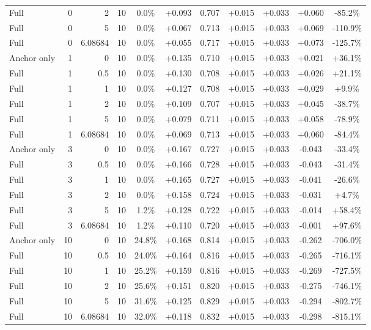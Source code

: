 \begin{table}[htbp]
\begin{tabular}{lrrrccccccc}
Full & 0 & 2 & 10 & 0.0\% & +0.093 & 0.707 & +0.015 & +0.033 & +0.060 & -85.2\% \\
Full & 0 & 5 & 10 & 0.0\% & +0.067 & 0.713 & +0.015 & +0.033 & +0.069 & -110.9\% \\
Full & 0 & 6.08684 & 10 & 0.0\% & +0.055 & 0.717 & +0.015 & +0.033 & +0.073 & -125.7\% \\
Anchor only & 1 & 0 & 10 & 0.0\% & +0.135 & 0.710 & +0.015 & +0.033 & +0.021 & +36.1\% \\
Full & 1 & 0.5 & 10 & 0.0\% & +0.130 & 0.708 & +0.015 & +0.033 & +0.026 & +21.1\% \\
Full & 1 & 1 & 10 & 0.0\% & +0.127 & 0.708 & +0.015 & +0.033 & +0.029 & +9.9\% \\
Full & 1 & 2 & 10 & 0.0\% & +0.109 & 0.707 & +0.015 & +0.033 & +0.045 & -38.7\% \\
Full & 1 & 5 & 10 & 0.0\% & +0.079 & 0.711 & +0.015 & +0.033 & +0.058 & -78.9\% \\
Full & 1 & 6.08684 & 10 & 0.0\% & +0.069 & 0.713 & +0.015 & +0.033 & +0.060 & -84.4\% \\
Anchor only & 3 & 0 & 10 & 0.0\% & +0.167 & 0.727 & +0.015 & +0.033 & -0.043 & -33.4\% \\
Full & 3 & 0.5 & 10 & 0.0\% & +0.166 & 0.728 & +0.015 & +0.033 & -0.043 & -31.4\% \\
Full & 3 & 1 & 10 & 0.0\% & +0.165 & 0.727 & +0.015 & +0.033 & -0.041 & -26.6\% \\
Full & 3 & 2 & 10 & 0.0\% & +0.158 & 0.724 & +0.015 & +0.033 & -0.031 & +4.7\% \\
Full & 3 & 5 & 10 & 1.2\% & +0.128 & 0.722 & +0.015 & +0.033 & -0.014 & +58.4\% \\
Full & 3 & 6.08684 & 10 & 1.2\% & +0.110 & 0.720 & +0.015 & +0.033 & -0.001 & +97.6\% \\
Anchor only & 10 & 0 & 10 & 24.8\% & +0.168 & 0.814 & +0.015 & +0.033 & -0.262 & -706.0\% \\
Full & 10 & 0.5 & 10 & 24.0\% & +0.164 & 0.816 & +0.015 & +0.033 & -0.265 & -716.1\% \\
Full & 10 & 1 & 10 & 25.2\% & +0.159 & 0.816 & +0.015 & +0.033 & -0.269 & -727.5\% \\
Full & 10 & 2 & 10 & 25.6\% & +0.151 & 0.820 & +0.015 & +0.033 & -0.275 & -746.1\% \\
Full & 10 & 5 & 10 & 31.6\% & +0.125 & 0.829 & +0.015 & +0.033 & -0.294 & -802.7\% \\
Full & 10 & 6.08684 & 10 & 32.0\% & +0.118 & 0.832 & +0.015 & +0.033 & -0.298 & -815.1\% \\

\end{tabular}
\end{table}

